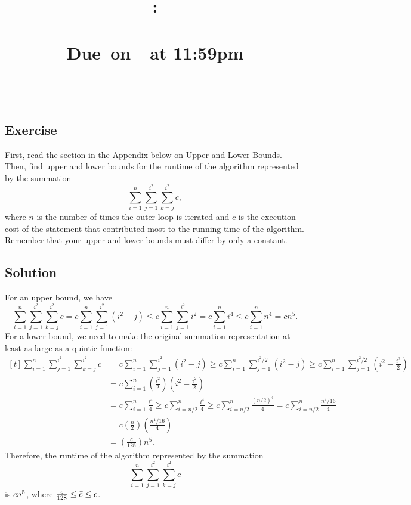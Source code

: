 \documentclass{article}
\title{
    \vspace{2in}
    \textbf{\hmwkClass:\\ \hmwkTitle}\\
    \normalsize\vspace{0.1in}\small{Due\ on\ \hmwkDueDate\ at 11:59pm}\\
    \vspace{0.1in}\large{\textit{\hmwkClassInstructor\ \hmwkSection}}
    \vspace{3in}
    \author{\textbf{\hmwkAuthorName}}
    \date{}
}
\newcounter{counter}
\newcommand{\Exercise}{Exercise \stepcounter{counter}\thecounter}
\begin{document}
\maketitle
\pagebreak

\subsection*{\Exercise}
    First, read the section in the Appendix below on Upper and Lower Bounds. Then, find upper and lower bounds for the runtime of the algorithm represented by the summation $$\sum_{i = 1}^{n} \sum_{j = 1}^{i^2} \sum_{k = j}^{i^2} c,$$ where $n$ is the number of times the outer loop is iterated and $c$ is the execution cost of the statement that contributed most to the running time of the algorithm. Remember that your upper and lower bounds must differ by only a constant.

\subsection*{Solution }
    For an upper bound, we have $$\sum_{i = 1}^{n} \sum_{j = 1}^{i^2} \sum_{k = j}^{i^2} c = c \sum_{i = 1}^{n} \sum_{j = 1}^{i^2} (i^{2} - j) \le c \sum_{i = 1}^{n} \sum_{j = 1}^{i^2} i^{2} = c \sum_{i = 1}^{n} i^{4} \le c \sum_{i = 1}^{n}  n^{4} = cn^{5}.$$ For a lower bound, we need to make the original summation representation at least as large as a quintic function:
    $$\begin{aligned}[t]
        \sum_{i = 1}^{n} \sum_{j = 1}^{i^2} \sum_{k = j}^{i^2} c &= c \sum_{i = 1}^{n} \sum_{j = 1}^{i^2} (i^{2} - j) \ge c \sum_{i = 1}^{n} \sum_{j = 1}^{i^2/2} (i^{2} - j) \ge c \sum_{i = 1}^{n} \sum_{j = 1}^{i^2/2} \left(i^{2} - \frac{i^2}{2}\right) \\
        &= c \sum_{i = 1}^{n} \left(\frac{i^2}{2}\right) \left(i^{2} - \frac{i^2}{2}\right) \\
        &= c \sum_{i = 1}^{n} \frac{i^{4}}{4} \ge c \sum_{i = n/2}^{n} \frac{i^{4}}{4} \ge c \sum_{i = n/2}^{n} \frac{(n/2)^{4}}{4} = c \sum_{i = n/2}^{n} \frac{n^{4}/16}{4} \\
        &= c \left(\frac{n}{2}\right)\left(\frac{n^{4}/16}{4}\right) \\
        &= \left(\frac{c}{128}\right)n^{5}.
    \end{aligned}$$ Therefore, the runtime of the algorithm represented by the summation $$\sum_{i = 1}^{n} \sum_{j = 1}^{i^2} \sum_{k = j}^{i^2} c$$ is $\Bar{c}n^{5}$, where $\frac{c}{128} \le \Bar{c} \le c$.
\end{document}

